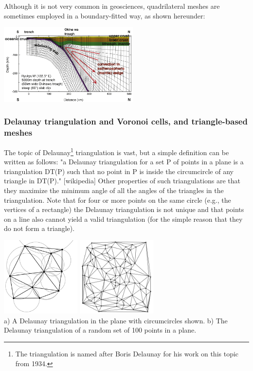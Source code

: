 
Although it is not very common in geosciences, quadrilateral meshes are sometimes 
employed in a boundary-fitted way, as shown hereunder:

\begin{center}
\includegraphics[width=7cm]{images/meshes/gukt16}\\
\end{center}


\subsubsection{Delaunay triangulation and Voronoi cells, and triangle-based meshes}

The topic of Delaunay\footnote{The triangulation is named after 
Boris Delaunay for his work on this topic from 1934.}
 triangulation is vast, but a simple definition can be written 
as follows:
"a Delaunay triangulation for a set P 
of points in a plane is a triangulation DT(P) such that no point in P is  
inside the circumcircle of any triangle in DT(P)." [wikipedia]
Other properties of such triangulations are that they 
maximize the minimum angle of all the angles of the 
triangles in the triangulation.
Note that for four or more 
points on the same circle (e.g., the vertices of a rectangle) the Delaunay triangulation is  
not unique and that points on a line also cannot yield a valid triangulation
(for the simple reason that they do not form a triangle).

\begin{center}
\includegraphics[width=4cm]{images/meshes/delaunay}
\includegraphics[width=4cm]{images/meshes/delaunay3}\\
{\captionfont a) A Delaunay triangulation in the plane with circumcircles shown.
b) The Delaunay triangulation of a random set of 100 points in a plane.}
\end{center}

